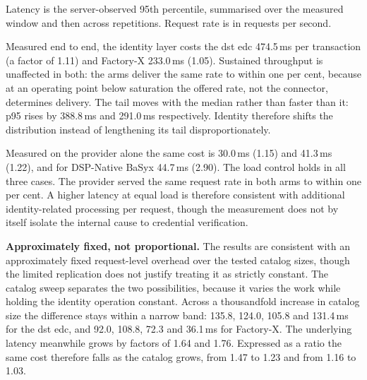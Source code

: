 \begin{table}[H]
    \centering
    \begin{threeparttable}
    \small
    \setlength{\tabcolsep}{4pt}
    
    \begin{tablenotes}\footnotesize
        \item Latency is the server-observed 95th percentile, summarised over the
        measured window and then across repetitions. Request rate is in requests per
        second.
    \end{tablenotes}
    \end{threeparttable}
    \caption[Identity overhead measured on the provider]{Identity overhead measured on
    the provider itself, with the provider's request rate as a load control.}
    \label{tab:x1-provider}
\end{table}

\pagebreak

Measured end to end, the identity layer costs the \gls{dst} \gls{edc} 474.5\,ms per
transaction (a factor of 1.11) and Factory-X 233.0\,ms (1.05). Sustained throughput is
unaffected in both: the arms deliver the same rate to within one per cent, because at an
operating point below saturation the offered rate, not the connector, determines
delivery. The tail moves with the median rather than faster than it: p95 rises by
388.8\,ms and 291.0\,ms respectively. Identity therefore shifts the distribution instead of
lengthening its tail disproportionately.

Measured on the provider alone the same cost is 30.0\,ms (1.15) and 41.3\,ms (1.22), and
for DSP-Native BaSyx 44.7\,ms (2.90). The load control holds in all three cases. The
provider served the same request rate in both arms to within one per cent. A higher
latency at equal load is therefore consistent with additional identity-related processing per
request, though the measurement does not by itself isolate the internal cause to credential
verification.

\textbf{Approximately fixed, not proportional.} The results are consistent with an approximately fixed request-level overhead over the tested catalog sizes, though the limited replication does not justify treating it as strictly constant. The catalog sweep
separates the two possibilities, because it varies the work while holding the identity
operation constant. Across a thousandfold increase in catalog size the difference stays
within a narrow band: 135.8, 124.0, 105.8 and 131.4\,ms for the \gls{dst}
\gls{edc}, and 92.0, 108.8, 72.3 and 36.1\,ms for Factory-X. The underlying
latency meanwhile grows by factors of 1.64 and 1.76. Expressed as a ratio the same cost therefore
falls as the catalog grows, from 1.47 to 1.23 and from 1.16 to 1.03.


